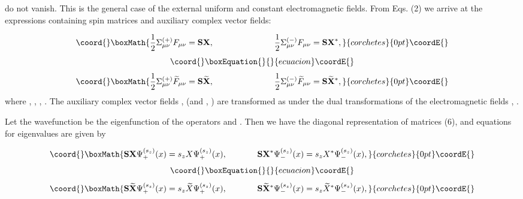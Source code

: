 \documentclass[a4paper,12pt]{article}
\begin{document}
do not vanish. This is the general case of the external uniform and constant
electromagnetic fields. From Eqs. (2) we arrive at the expressions
containing spin matrices and auxiliary complex vector fields:

\[\coord{}\boxMath{
\frac 12\Sigma _{\mu \nu }^{(+)}F_{\mu \nu }=\mathbf{SX},\hspace{1.0in}\frac
12\Sigma _{\mu \nu }^{(-)}F_{\mu \nu }=\mathbf{SX}^{*},
}{corchetes}{0pt}\coordE{}\]
\vspace{-8mm}
\begin{equation}\coord{}\boxEquation{
\label{6}
}{
}{ecuacion}\coordE{}\end{equation}
\vspace{-8mm}
\[\coord{}\boxMath{
\frac 12\Sigma _{\mu \nu }^{(+)}\widetilde{F}_{\mu \nu
}=\mathbf{S} \widetilde{\mathbf{X}},\hspace{1.0in}\frac 12\Sigma
_{\mu \nu }^{(-)} \widetilde{F}_{\mu \nu
}=\mathbf{S}\widetilde{\mathbf{X}}^{*},
}{corchetes}{0pt}\coordE{}\]
where \coordHE{}, \coordHE{}, \coordHE{}, \coordHE{}. The auxiliary complex vector
fields \coordHE{}, \coordHE{} (and \coordHE{},
\coordHE{}) are transformed as \coordHE{} under the dual transformations of the
electromagnetic fields \coordHE{}, \coordHE{}.

Let the wavefunction \coordHE{} be the eigenfunction of the
operators \coordHE{} and \coordHE{}. Then we have
the diagonal representation of matrices (6), and equations for eigenvalues
are given by

\[\coord{}\boxMath{
\mathbf{SX}\Psi _{+}^{(s_z)}(x)=s_zX\Psi _{+}^{(s_z)}(x),\hspace{0.5in}
\mathbf{SX}^{*}\Psi _{-}^{(s_z)}(x)=s_zX^{*}\Psi _{-}^{(s_z)}(x),
}{corchetes}{0pt}\coordE{}\]
\vspace{-8mm}
\begin{equation}\coord{}\boxEquation{  \label{7}
}{  }{ecuacion}\coordE{}\end{equation}
\vspace{-8mm}
\[\coord{}\boxMath{
\mathbf{S}\widetilde{\mathbf{X}}\Psi _{+}^{(s_z)}(x)=s_z\widetilde{X}\Psi
_{+}^{(s_z)}(x),\hspace{0.5in}\mathbf{S}\widetilde{\mathbf{X}}^{*}\Psi
_{-}^{(s_z)}(x)=s_z\widetilde{X}^{*}\Psi _{-}^{(s_z)}(x),
}{corchetes}{0pt}\coordE{}\]
\end{document}

